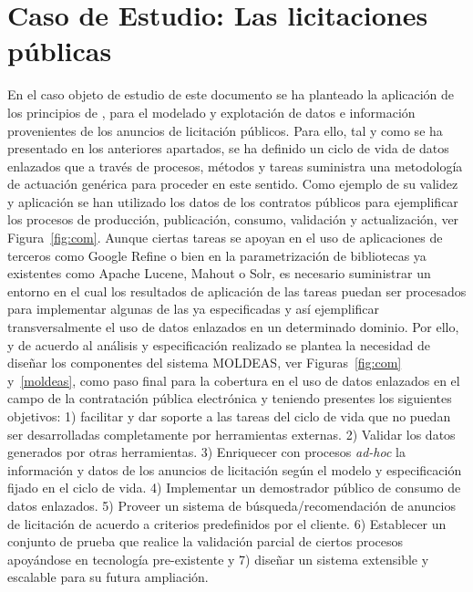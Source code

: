\documentclass[a4paper,final,11pt,fleqn,twoside]{book}  %
\begin{document}
\section{Caso de Estudio: Las licitaciones públicas}
En el caso objeto de estudio de este documento se ha planteado la aplicación de los principios 
de \linkeddata, para el modelado y explotación de datos e información provenientes de los anuncios de 
licitación públicos. Para ello, tal y como se ha presentado en los anteriores apartados, se ha definido 
un ciclo de vida de datos enlazados que a través de procesos, métodos y tareas suministra una metodología 
de actuación genérica para proceder en este sentido. Como ejemplo de su validez y aplicación se han utilizado 
los datos de los contratos públicos para ejemplificar los procesos de producción, publicación, consumo, validación y 
actualización, ver Figura~\ref{fig:com}. Aunque ciertas tareas se apoyan en el uso de aplicaciones de terceros como Google Refine o bien 
en la parametrización de bibliotecas ya existentes como Apache Lucene, Mahout o Solr, es necesario suministrar un entorno 
en el cual los resultados de aplicación de las tareas puedan ser procesados para implementar algunas de las ya 
especificadas y así ejemplificar transversalmente el uso de datos enlazados en un determinado dominio. Por ello, y 
de acuerdo al análisis y especificación realizado se plantea la necesidad de diseñar los componentes del sistema 
MOLDEAS, ver Figuras~\ref{fig:com} y~\ref{moldeas}, como paso final para la cobertura en el uso de datos enlazados en el campo de la contratación pública 
electrónica y teniendo presentes los siguientes objetivos: 1) facilitar y dar soporte a las tareas del ciclo de vida que no puedan ser desarrolladas completamente 
por herramientas externas. 2)  Validar los datos generados por otras herramientas. 3) Enriquecer con procesos \textit{ad-hoc} la información y datos de los anuncios de licitación según el modelo 
y especificación fijado en el ciclo de vida. 4) Implementar un demostrador público de consumo de datos enlazados. 
5) Proveer un sistema de búsqueda/recomendación de anuncios de licitación de acuerdo a criterios predefinidos por el cliente. 6) Establecer un conjunto de prueba que realice la validación parcial de ciertos procesos apoyándose en tecnología 
pre-existente y 7) diseñar un sistema extensible y escalable para su futura ampliación.
\end{document}
